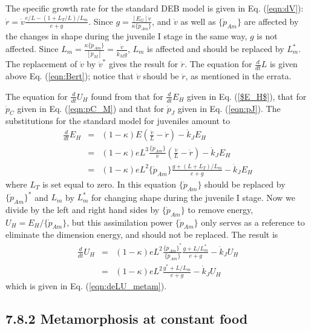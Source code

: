 The specific growth rate for the standard DEB model is given in Eq. (\ref{eqn:dV}): 
$\dot{r} = \dot{v} \frac{e/ L - (1 + L_T/ L)/ L_m} {e + g}$.
Since $g = \frac{[E_G] \dot{v}} {\kappa \{\dot{p}_{Am}\}}$, and $\dot{v}$ as well as $\{\dot{p}_{Am}\}$ are affected by the changes in shape during the juvenile I stage in the same way, $g$ is not affected.
Since $L_m = \frac{\kappa \{\dot{p}_{Am}\}} {[\dot{p}_M]} = \frac{\dot{v}} {\dot{k}_M g}$, $L_m$ is affected and should be replaced by $L_m^*$.
The replacement of $\dot{v}$ by $\dot{v}^*$ gives the result for $\dot{r}$.
The equation for $\frac{d}{dt} L$ is given above Eq. (\ref{eqn:Bert}); notice that $\dot{v}$ should be $\dot{r}$, as mentioned in the errata.

The equation for $\frac{d} {dt} U_H$ found from that for $\frac{d} {dt} E_H$ given in Eq. (\ref{$E_H$}), that for $\dot{p}_C$ given in Eq. (\ref{eqn:pC_M}) and that for $\dot{p}_J$ given in Eq. (\ref{eqn:pJ}).
The substitutions for the standard model for juveniles amount to 
\begin{eqnarray}
  \frac{d} {dt} E_H &=& (1 - \kappa) E (\frac{\dot{v}}{L} - \dot{r}) - \dot{k}_J E_H
  \\
       &=& (1 - \kappa) e L^3 \frac{\{\dot{p}_{Am}\}} {\dot{v}} (\frac{\dot{v}}{L} - \dot{r}) - \dot{k}_J E_H
  \\
       &=& (1 - \kappa) e L^2 \{\dot{p}_{Am}\} \frac{g + (L + L_T)/ L_m}{e + g} - \dot{k}_J E_H
\end{eqnarray}
where $L_T$ is set equal to zero.
In this equation $\{\dot{p}_{Am}\}$ should be replaced by $\{\dot{p}_{Am}\}^*$ and $L_m$ by $L_m^*$ for changing shape during the juvenile I stage.
Now we divide by the left and right hand sides by $\{\dot{p}_{Am}\}$ to remove energy, $U_H = E_H/ \{\dot{p}_{Am}\}$, 
but this assimilation power $\{\dot{p}_{Am}\}$ only serves as a reference to eliminate the dimension energy, and should not be replaced.
The result is
\begin{eqnarray}
  \frac{d} {dt} U_H 
       &=& (1 - \kappa) e L^2 \frac{\{\dot{p}_{Am}\}^*}{\{\dot{p}_{Am}\}} \frac{g + L / L_m^*}{e + g} - \dot{k}_J U_H
  \\
       &=& (1 - \kappa) e L^2 \frac{g^* + L / L_m}{e + g} - \dot{k}_J U_H
\end{eqnarray}
which is given in Eq. (\ref{eqn:deLU_metam}).

\subsection*{7.8.2 Metamorphosis at constant food}
{}
\label{sec_c:metamorphosis_a}

